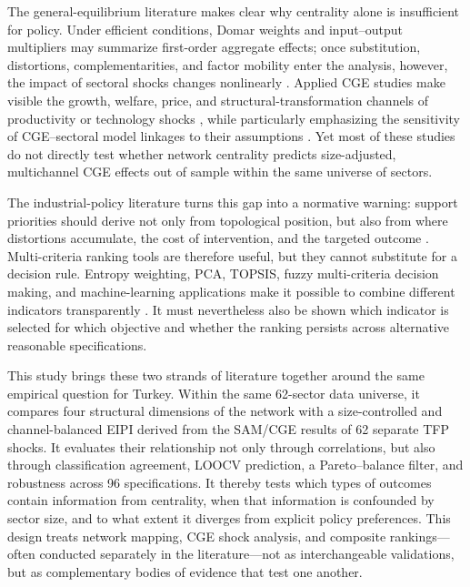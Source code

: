The general-equilibrium literature makes clear why centrality alone is insufficient for policy. Under efficient conditions, Domar weights and input--output multipliers may summarize first-order aggregate effects; once substitution, distortions, complementarities, and factor mobility enter the analysis, however, the impact of sectoral shocks changes nonlinearly \citep{ref-fadinger2022,ref-baqaee-farhi2019b,ref-baqaee-farhi2020a,ref-baqaee-farhi2020b,ref-bahal-lenzo2023}. Applied CGE studies make visible the growth, welfare, price, and structural-transformation channels of productivity or technology shocks \citep{ref-cutler-davies2010,ref-burnett2012,ref-antoszewski2019,ref-khan2020,ref-blackburn-moreno2021,ref-jin-li2025}, while particularly emphasizing the sensitivity of CGE--sectoral model linkages to their assumptions \citep{ref-delzeit2020,ref-bolarinwa2024,ref-odior-arinze2022}. Yet most of these studies do not directly test whether network centrality predicts size-adjusted, multichannel CGE effects out of sample within the same universe of sectors.

The industrial-policy literature turns this gap into a normative warning: support priorities should derive not only from topological position, but also from where distortions accumulate, the cost of intervention, and the targeted outcome \citep{ref-liu2019,ref-martinez-orrillo2024}. Multi-criteria ranking tools are therefore useful, but they cannot substitute for a decision rule. Entropy weighting, PCA, TOPSIS, fuzzy multi-criteria decision making, and machine-learning applications make it possible to combine different indicators transparently \citep{ref-andre-cardenete2009,ref-jin2022,ref-tsoulfidis-athanasiadis2022,ref-calik2018,ref-turegun2022,ref-jamwal2021,ref-ionascu2024,ref-hlushko2025,ref-faridzad2025}. It must nevertheless also be shown which indicator is selected for which objective and whether the ranking persists across alternative reasonable specifications.

This study brings these two strands of literature together around the same empirical question for Turkey. Within the same 62-sector data universe, it compares four structural dimensions of the network with a size-controlled and channel-balanced EIPI derived from the SAM/CGE results of 62 separate TFP shocks. It evaluates their relationship not only through correlations, but also through classification agreement, LOOCV prediction, a Pareto--balance filter, and robustness across 96 specifications. It thereby tests which types of outcomes contain information from centrality, when that information is confounded by sector size, and to what extent it diverges from explicit policy preferences. This design treats network mapping, CGE shock analysis, and composite rankings---often conducted separately in the literature---not as interchangeable validations, but as complementary bodies of evidence that test one another.

